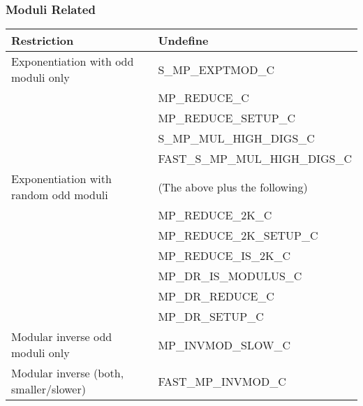 \documentclass[synpaper]{book}
\begin{document}
\subsubsection{Moduli Related}
\begin{small}
  \begin{center}
    \begin{tabular}{|l|l|}
      \hline \textbf{Restriction}                   & \textbf{Undefine}               \\
      \hline Exponentiation with odd moduli only    & S\_MP\_EXPTMOD\_C               \\
                                                    & MP\_REDUCE\_C                   \\
                                                    & MP\_REDUCE\_SETUP\_C            \\
                                                    & S\_MP\_MUL\_HIGH\_DIGS\_C       \\
                                                    & FAST\_S\_MP\_MUL\_HIGH\_DIGS\_C \\
      \hline Exponentiation with random odd moduli  & (The above plus the following)  \\
                                                    & MP\_REDUCE\_2K\_C               \\
                                                    & MP\_REDUCE\_2K\_SETUP\_C        \\
                                                    & MP\_REDUCE\_IS\_2K\_C           \\
                                                    & MP\_DR\_IS\_MODULUS\_C          \\
                                                    & MP\_DR\_REDUCE\_C               \\
                                                    & MP\_DR\_SETUP\_C                \\
      \hline Modular inverse odd moduli only        & MP\_INVMOD\_SLOW\_C             \\
      \hline Modular inverse (both, smaller/slower) & FAST\_MP\_INVMOD\_C             \\
      \hline
    \end{tabular}
  \end{center}
\end{small}
\end{document}
